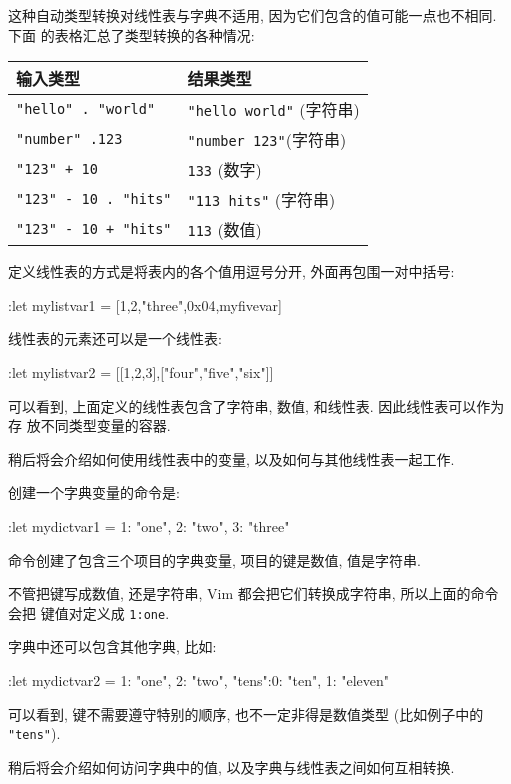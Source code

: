 这种自动类型转换对线性表与字典不适用, 因为它们包含的值可能一点也不相同. 下面
的表格汇总了类型转换的各种情况:
\begin{center}
    \begin{tabular}{ll}
        \hline
        输入类型 & 结果类型 \\
        \hline
        \texttt{"hello" . "world"}  & \texttt{"hello world"} (字符串) \\
        \texttt{"number" .123}  & \texttt{"number 123"}(字符串) \\
        \texttt{"123" + 10} & \texttt{133} (数字) \\
        \texttt{"123" - 10 . "hits"} & \texttt{"113 hits"} (字符串) \\
        \texttt{"123" - 10 + "hits"} & \texttt{113} (数值) \\
        \hline
    \end{tabular}
\end{center}

定义线性表的方式是将表内的各个值用逗号分开, 外面再包围一对中括号:
\begin{vimcode}
:let mylistvar1 = [1,2,"three",0x04,myfivevar]
\end{vimcode}
线性表的元素还可以是一个线性表:
\begin{vimcode}
:let mylistvar2 = [[1,2,3],["four","five","six"]]
\end{vimcode}

可以看到, 上面定义的线性表包含了字符串, 数值, 和线性表. 因此线性表可以作为存
放不同类型变量的容器.

稍后将会介绍如何使用线性表中的变量, 以及如何与其他线性表一起工作.

创建一个字典变量的命令是:
\begin{vimcode}
:let mydictvar1 = {1: "one", 2: "two", 3: "three"}
\end{vimcode}
命令创建了包含三个项目的字典变量, 项目的键是数值, 值是字符串.

不管把键写成数值, 还是字符串, Vim 都会把它们转换成字符串, 所以上面的命令会把
键值对定义成 \texttt{1:one}.

字典中还可以包含其他字典, 比如:
\begin{vimcode}
:let mydictvar2 = {1: "one", 2: "two", "tens":{0: "ten", 1: "eleven"}}
\end{vimcode}
可以看到, 键不需要遵守特别的顺序, 也不一定非得是数值类型 (比如例子中的
\texttt{"tens"}).

稍后将会介绍如何访问字典中的值, 以及字典与线性表之间如何互相转换.

